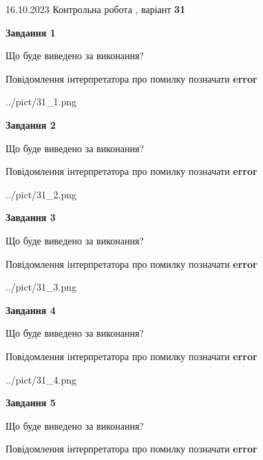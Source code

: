 \documentclass[12pt, ukrainian]{article}
\begin{document}
{\Large{16.10.2023 Контрольна робота , варіант  \No \textbf { 31 }\par}}
{
\begin {large}
{\begin {center}\textbf{Завдання 1}\end {center}}\par
Що буде виведено за виконання? \par
Повідомлення інтерпретатора про помилку позначати \textbf{error}

\begin{center}
	{../pict/31_1.png}
\end{center}
\newpage

{\begin {center}\textbf{Завдання 2}\end {center}}\par
Що буде виведено за виконання? \par
Повідомлення інтерпретатора про помилку позначати \textbf{error}

\begin{center}
	{../pict/31_2.png}
\end{center}
\newpage

{\begin {center}\textbf{Завдання 3}\end {center}}\par
Що буде виведено за виконання? \par
Повідомлення інтерпретатора про помилку позначати \textbf{error}

\begin{center}
	{../pict/31_3.png}
\end{center}
\newpage

{\begin {center}\textbf{Завдання 4}\end {center}}\par
Що буде виведено за виконання? \par
Повідомлення інтерпретатора про помилку позначати \textbf{error}

\begin{center}
	{../pict/31_4.png}
\end{center}
\newpage

{\begin {center}\textbf{Завдання 5}\end {center}}\par
Що буде виведено за виконання? \par
Повідомлення інтерпретатора про помилку позначати \textbf{error}


\end{large}}
\end{document}
